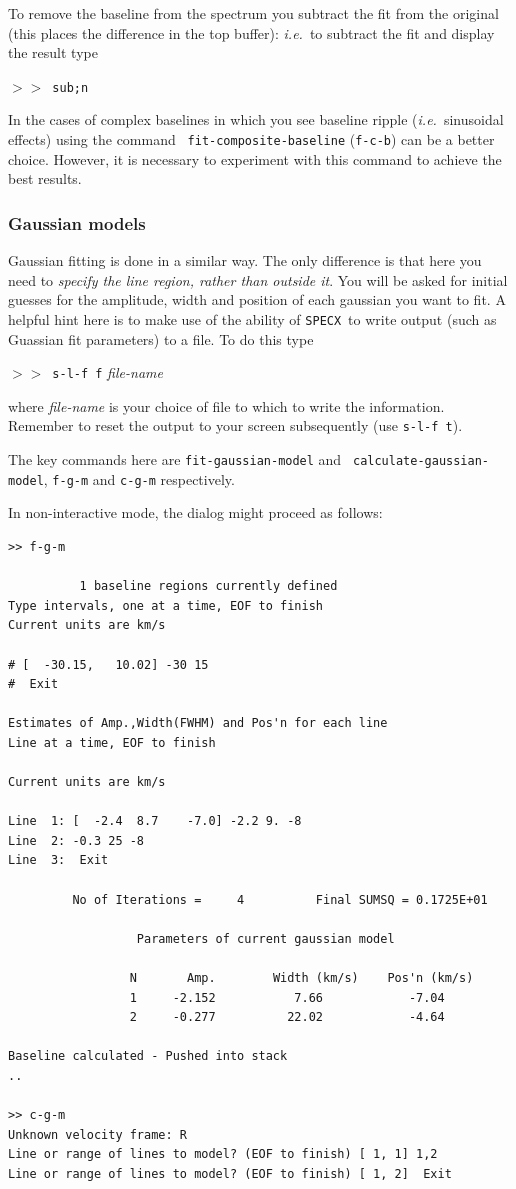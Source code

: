 \documentclass[11pt,twoside]{article}
\newcommand{\ie}{{\it i.e.}}
\newcommand{\SPECX}{{\tt SPECX}}
\newcommand{\SP}{{$>\!>$}}
\begin{document}
To remove the baseline from the spectrum you subtract the fit from the
original (this places the difference in the top buffer): \ie\ to
subtract the fit and display the result type

\SP\ \verb|sub;n|

In the cases of complex baselines in which you see baseline ripple
(\ie\ sinusoidal effects) using the command {\tt
fit-composite-baseline} ({\tt{f-c-b}}) can be a better choice. However,
it is necessary to experiment with this command to achieve the best
results.

\subsubsection{Gaussian models}
Gaussian fitting is done in a similar way.  The only difference is
that here you need to {\it specify the line region, rather than outside
it}. You will be asked for initial guesses for the amplitude, width and
position of each gaussian you want to fit. A helpful hint here is to
make use of the ability of \SPECX\ to write output (such as Guassian
fit parameters) to a file. To do this type

\SP\ \verb|s-l-f f| {\it file-name}

where {\it file-name} is your choice of file to which to write the
information.  Remember to reset the output to your screen subsequently
(use {\tt s-l-f t}).

The key commands here are {\tt fit-gaussian-model} and {\tt 
calculate-gaussian-model}, {\tt f-g-m} and {\tt c-g-m} respectively.

In non-interactive mode, the dialog might proceed as follows:
\begin{verbatim}
>> f-g-m

          1 baseline regions currently defined
Type intervals, one at a time, EOF to finish
Current units are km/s

# [  -30.15,   10.02] -30 15
#  Exit

Estimates of Amp.,Width(FWHM) and Pos'n for each line
Line at a time, EOF to finish

Current units are km/s

Line  1: [  -2.4  8.7    -7.0] -2.2 9. -8
Line  2: -0.3 25 -8
Line  3:  Exit

         No of Iterations =     4          Final SUMSQ = 0.1725E+01

                  Parameters of current gaussian model

                 N       Amp.        Width (km/s)    Pos'n (km/s)
                 1     -2.152           7.66            -7.04
                 2     -0.277          22.02            -4.64

Baseline calculated - Pushed into stack
..

>> c-g-m
Unknown velocity frame: R
Line or range of lines to model? (EOF to finish) [ 1, 1] 1,2
Line or range of lines to model? (EOF to finish) [ 1, 2]  Exit
\end{verbatim}
\end{document}
